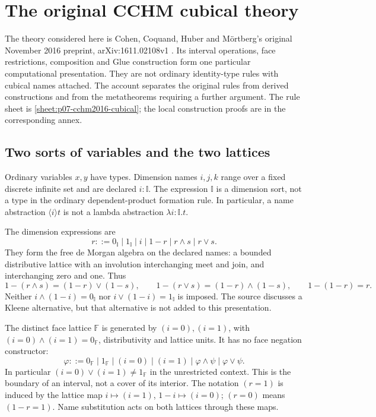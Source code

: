 \section{The original CCHM cubical theory}
\label{sec:p07-cchm2016}

The theory considered here is Cohen, Coquand, Huber and M\"ortberg's
original November 2016 preprint, arXiv:1611.02108v1
\cite{CCHM2016ArxivV1}.  Its interval operations, face restrictions,
composition and Glue construction form one particular computational
presentation.  They are not ordinary identity-type rules with cubical
names attached.  The account separates the original rules from derived
constructions and from the metatheorems requiring a further argument.
The rule sheet is \ref{sheet:p07-cchm2016-cubical}; the local construction
proofs are in the corresponding annex.

\subsection{Two sorts of variables and the two lattices}
\label{sec:p07-cchm2016-dimensions}

Ordinary variables \(x,y\) have types.  Dimension names \(i,j,k\) range
over a fixed discrete infinite set and are declared \(i:\mathbb I\).
The expression \(\mathbb I\) is a dimension sort, not a type in the
ordinary dependent-product formation rule.  In particular, a name
abstraction \(\langle i\rangle t\) is not a lambda abstraction
\(\lambda i:\mathbb I.t\).

The dimension expressions are
\[
 r ::= 0_{\mathbb I}\mid1_{\mathbb I}\mid i\mid1-r
       \mid r\wedge s\mid r\vee s .
\]
They form the free de Morgan algebra on the declared names: a bounded
distributive lattice with an involution interchanging meet and join,
and interchanging zero and one.  Thus
\[
 1-(r\wedge s)=(1-r)\vee(1-s),\qquad
 1-(r\vee s)=(1-r)\wedge(1-s),\qquad1-(1-r)=r.
\]
Neither \(i\wedge(1-i)=0_{\mathbb I}\) nor
\(i\vee(1-i)=1_{\mathbb I}\) is imposed.  The source discusses a Kleene
alternative, but that alternative is not added to this presentation.

The distinct face lattice \(\mathbb F\) is generated by
\((i=0),(i=1)\), with
\((i=0)\wedge(i=1)=0_{\mathbb F}\), distributivity and lattice units.
It has no face negation constructor:
\[
 \varphi ::=0_{\mathbb F}\mid1_{\mathbb F}\mid(i=0)\mid(i=1)
                       \mid\varphi\wedge\psi\mid\varphi\vee\psi.
\]
In particular \((i=0)\vee(i=1)\ne1_{\mathbb F}\) in the unrestricted
context.  This is the boundary of an interval, not a cover of its
interior.  The notation \((r=1)\) is induced by the lattice map
\(i\mapsto(i=1)\), \(1-i\mapsto(i=0)\); \((r=0)\) means \((1-r=1)\).
Name substitution acts on both lattices through these maps.

